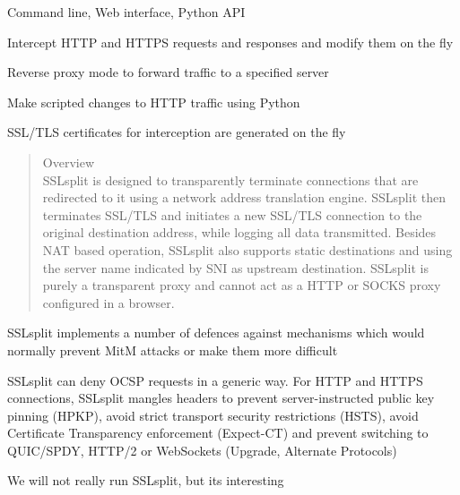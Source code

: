 \documentclass[Screen16to9,17pt]{foils}
\begin{document}

\begin{list2}
\item Command line, Web interface, Python API
\item Intercept HTTP and HTTPS requests and responses and modify them on the fly
\item Reverse proxy mode to forward traffic to a specified server
\item Make scripted changes to HTTP traffic using Python
\item SSL/TLS certificates for interception are generated on the fly
\end{list2}


\begin{quote}\small
Overview\\
SSLsplit is designed to transparently terminate connections that are redirected to it using a network address translation engine. SSLsplit then terminates SSL/TLS and initiates a new SSL/TLS connection to the original destination address, while logging all data transmitted. Besides NAT based operation, SSLsplit also supports static destinations and using the server name indicated by SNI as upstream destination. SSLsplit is purely a transparent proxy and cannot act as a HTTP or SOCKS proxy configured in a browser.
\end{quote}


\begin{list2}
\item SSLsplit implements a number of defences against mechanisms which would normally prevent MitM attacks or make them more difficult
\item {\small SSLsplit can deny OCSP requests in a generic way. For HTTP and HTTPS connections, SSLsplit mangles headers to prevent server-instructed public key pinning (HPKP), avoid strict transport security restrictions (HSTS), avoid Certificate Transparency enforcement (Expect-CT) and prevent switching to QUIC/SPDY, HTTP/2 or WebSockets (Upgrade, Alternate Protocols)}
\end{list2}

\centerline{We will not really run SSLsplit, but its interesting}




\end{document}
